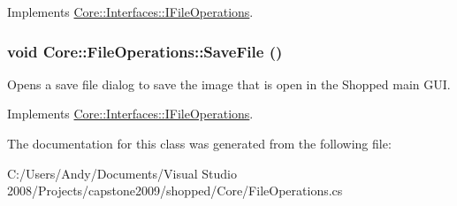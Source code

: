 Implements \hyperlink{interface_core_1_1_interfaces_1_1_i_file_operations}{Core::Interfaces::IFileOperations}.\hypertarget{class_core_1_1_file_operations_a4cabf77d73d7c51a6a97f9f49af1dfb6}{
\subsubsection[{SaveFile}]{\setlength{\rightskip}{0pt plus 5cm}void Core::FileOperations::SaveFile ()}}
\label{class_core_1_1_file_operations_a4cabf77d73d7c51a6a97f9f49af1dfb6}
Opens a save file dialog to save the image that is open in the Shopped main GUI. 

Implements \hyperlink{interface_core_1_1_interfaces_1_1_i_file_operations}{Core::Interfaces::IFileOperations}.

The documentation for this class was generated from the following file:\begin{DoxyCompactItemize}
\item 
C:/Users/Andy/Documents/Visual Studio 2008/Projects/capstone2009/shopped/Core/FileOperations.cs\end{DoxyCompactItemize}

